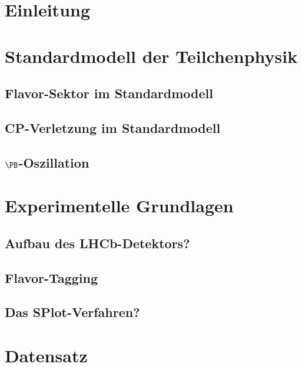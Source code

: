 
\section{Einleitung}

\section{Standardmodell der Teilchenphysik}

\subsection{Flavor-Sektor im Standardmodell}

\subsection{CP-Verletzung im Standardmodell}

\subsection{$\PB$-Oszillation}

\section{Experimentelle Grundlagen}

\subsection{Aufbau des LHCb-Detektors?}

\subsection{Flavor-Tagging}


\subsection{Das SPlot-Verfahren?}

\section{Datensatz}

